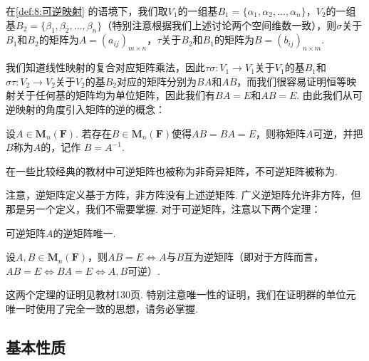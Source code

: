在\autoref{def:8:可逆映射} 的语境下，我们取$V_1$的一组基$B_1=\{\alpha_1,\alpha_2,\ldots,\alpha_n\}$，$V_2$的一组基$B_2=\{\beta_1,\beta_2,\ldots,\beta_n\}$（特别注意根据我们上述讨论两个空间维数一致），则$\sigma$关于$B_1$和$B_2$的矩阵为$A=(a_{ij})_{m \times n}$，$\tau$关于$B_2$和$B_1$的矩阵为$B=(b_{ij})_{n \times m}$.

我们知道线性映射的复合对应矩阵乘法，因此$\tau\sigma:V_1\to V_1$关于$V_1$的基$B_1$和$\sigma\tau:V_2\to V_2$关于$V_2$的基$B_2$对应的矩阵分别为$BA$和$AB$，而我们很容易证明恒等映射关于任何基的矩阵均为单位矩阵，因此我们有$BA=E$和$AB=E$. 由此我们从可逆映射的角度引入矩阵的逆的概念：
\begin{definition}[矩阵的逆]
    设$A \in \mathbf{M}_n(\mathbf{F})$. 若存在$B \in \mathbf{M}_n(\mathbf{F})$使得$AB=BA=E$，则称矩阵$A$可逆，并把$B$称为$A$的，记作 $ B = A^{-1} $.
\end{definition}
在一些比较经典的教材中可逆矩阵也被称为非奇异矩阵，不可逆矩阵被称为.

注意，逆矩阵定义基于方阵，非方阵没有上述逆矩阵. 广义逆矩阵允许非方阵，但那是另一个定义，我们不需要掌握. 对于可逆矩阵，注意以下两个定理：
\begin{theorem}
    可逆矩阵$A$的逆矩阵唯一.
\end{theorem}

\begin{theorem}
    设$A,B\in \mathbf{M}_n(\mathbf{F})$，则$AB=E \iff A$与$B$互为逆矩阵（即对于方阵而言，$AB=E\iff BA=E\iff A,B$可逆）.
\end{theorem}
这两个定理的证明见教材130页. 特别注意唯一性的证明，我们在证明群的单位元唯一时使用了完全一致的思想，请务必掌握.

\subsection{基本性质}

